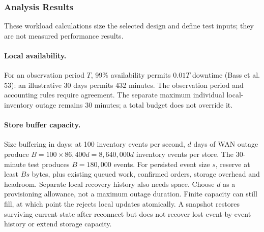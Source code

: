 \subsubsection{Analysis Results}
\label{sec:analysis-results}

These workload calculations size the selected design and define test inputs; they
are not measured performance results.

\paragraph{Local availability.}
For an observation period \(T\), 99\% availability permits \(0.01T\) downtime
(Bass et al. 53): an illustrative 30 days permits 432 minutes.
The observation period and accounting rules require agreement. The separate maximum
individual local-inventory outage remains 30 minutes; a total budget does not override it.

\paragraph{Store buffer capacity.}
Size buffering in days: at 100 inventory events per second, \(d\) days of WAN outage
produce \(B=100\times86{,}400d=8{,}640{,}000d\) inventory events per store.
The 30-minute  test produces \(B=180{,}000\) events.
For persisted event size \(s\), reserve at least \(Bs\) bytes, plus existing queued
work, confirmed orders, storage overhead and headroom. Separate local recovery
history also needs space. Choose \(d\) as a provisioning allowance, not a maximum
outage duration. Finite capacity can still fill, at which point the \IEP rejects local
updates atomically. A snapshot restores surviving current state after reconnect but
does not recover lost event-by-event history or extend storage capacity.

